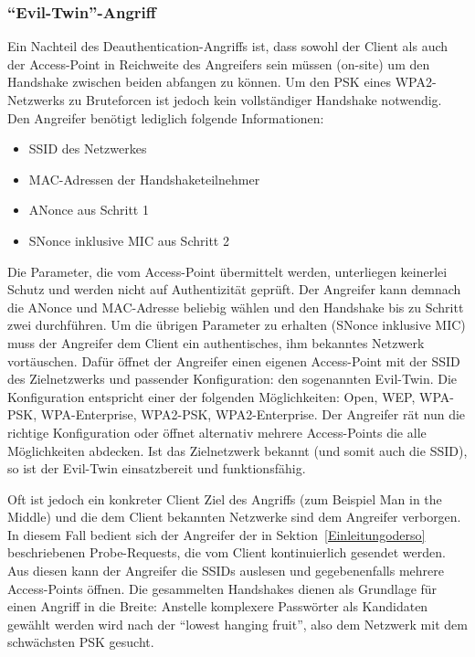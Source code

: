 \subsubsection{\enquote{Evil-Twin}-Angriff}\label{subs:evil-twin-attack}
Ein Nachteil des Deauthentication-Angriffs ist, dass sowohl der Client als auch der Access-Point in Reichweite des Angreifers sein müssen (on-site) um den Handshake zwischen beiden abfangen zu können.
Um den PSK eines WPA2-Netzwerks zu Bruteforcen ist jedoch kein vollständiger Handshake notwendig.
Den Angreifer benötigt lediglich folgende Informationen:
\begin{itemize}
	\item SSID des Netzwerkes 
	\item MAC-Adressen der Handshaketeilnehmer
	\item ANonce aus Schritt 1
	\item SNonce inklusive MIC aus Schritt 2
\end{itemize}
Die Parameter, die vom Access-Point übermittelt werden, unterliegen keinerlei Schutz und werden nicht auf Authentizität geprüft.
Der Angreifer kann demnach die ANonce und MAC-Adresse beliebig wählen und den Handshake bis zu Schritt zwei durchführen.
Um die übrigen Parameter zu erhalten (SNonce inklusive MIC) muss der Angreifer dem Client ein authentisches, ihm bekanntes Netzwerk vortäuschen.
Dafür öffnet der Angreifer einen eigenen Access-Point mit der SSID des Zielnetzwerks und passender Konfiguration: den sogenannten Evil-Twin.
Die Konfiguration entspricht einer der folgenden Möglichkeiten: Open, WEP, WPA-PSK, WPA-Enterprise, WPA2-PSK, WPA2-Enterprise.
Der Angreifer rät nun die richtige Konfiguration oder öffnet alternativ mehrere Access-Points die alle Möglichkeiten abdecken.
Ist das Zielnetzwerk bekannt (und somit auch die SSID), so ist der Evil-Twin einsatzbereit und funktionsfähig.

Oft ist jedoch ein konkreter Client Ziel des Angriffs (zum Beispiel Man in the Middle) und die dem Client bekannten Netzwerke sind dem Angreifer verborgen.
In diesem Fall bedient sich der Angreifer der in Sektion~\ref{Einleitungoderso} beschriebenen Probe-Requests, die vom Client kontinuierlich gesendet werden.
Aus diesen kann der Angreifer die SSIDs auslesen und gegebenenfalls mehrere Access-Points öffnen.
Die gesammelten Handshakes dienen als Grundlage für einen Angriff in die Breite: Anstelle komplexere Passwörter als Kandidaten gewählt werden wird nach der \enquote{lowest hanging fruit}, also dem Netzwerk mit dem schwächsten PSK gesucht.

